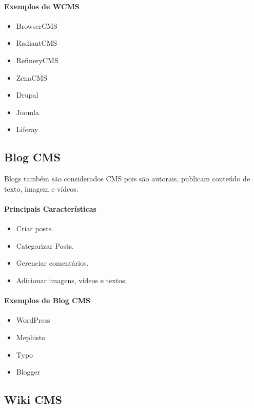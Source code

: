 \paragraph{Exemplos de WCMS} 

\begin{itemize}
  \item BrowserCMS
  \item RadiantCMS
  \item RefineryCMS
  \item ZenaCMS
  \item Drupal
  \item Joomla
  \item Liferay
\end{itemize}  


\subsection{Blog CMS} 

Blogs também são considerados CMS pois são autorais, publicam conteúdo de texto, imagem e vídeos.

\paragraph{Principais Características}

\begin{itemize}
  \item Criar posts.
  \item Categorizar Posts.
  \item Gerenciar comentários.
  \item Adicionar imagens, vídeos e textos.
\end{itemize}

\paragraph{Exemplos de Blog CMS} 

\begin{itemize}
  \item WordPress
  \item Mephisto
  \item Typo
  \item Blogger
\end{itemize}

\subsection{Wiki CMS} 

